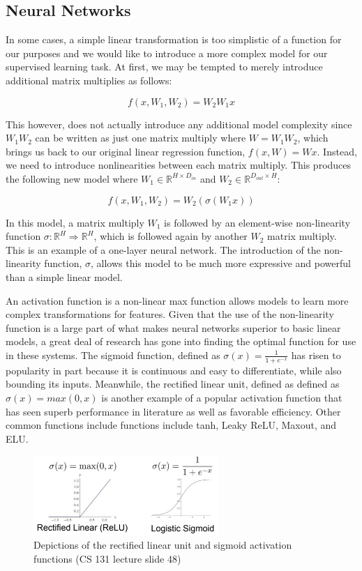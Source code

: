 ﻿\documentclass{article}
\begin{document}
\subsection{Neural Networks}
In some cases, a simple linear transformation is too simplistic of a function for our purposes and we would like to introduce a more complex model for our supervised learning task. At first, we may be tempted to merely introduce additional matrix multiplies as follows:

$$f(x, W_1, W_2) = W_2W_1x$$

This however, does not actually introduce any additional model complexity since $W_1W_2$ can be written as just one matrix multiply where $W = W_1W_2$, which brings us back to our original linear regression function, $f(x, W) = Wx$. Instead, we need to introduce nonlinearities between each matrix multiply. This produces the following new model where $W_1\in \mathbb{R}^{H \times D_{in}}$ and $W_2\in \mathbb{R}^{D_{out} \times H}$:

$$f(x,W_1,W_2) = W_2(\sigma(W_1x))$$ 

In this model, a matrix multiply $W_1$ is followed by an element-wise non-linearity function $\sigma : \mathbb{R}^H \Rightarrow \mathbb{R}^H$, which is followed again by another $W_2$ matrix multiply. This is an example of a one-layer neural network. The introduction of the non-linearity function, $\sigma$, allows this model to be much more expressive and powerful than a simple linear model.  

An activation function is a non-linear max function allows models to learn more complex transformations for features. Given that the use of the non-linearity function is a large part of what makes neural networks superior to basic linear models, a great deal of research has gone into finding the optimal function for use in these systems. The sigmoid function, defined as $\sigma(x) = \frac{1}{1+e^{-x}}$ has risen to popularity in part because it is continuous and easy to differentiate, while also bounding its inputs. Meanwhile, the rectified linear unit, defined as defined as $\sigma(x) = max(0,x)$ is another example of a popular activation function that has seen superb performance in literature as well as favorable efficiency. Other common functions include functions include tanh, Leaky ReLU, Maxout, and ELU.

\begin{figure}[h]
\includegraphics[width=7cm]{activation_functions.png}
\centering
\caption{Depictions of the rectified linear unit and sigmoid activation functions (CS 131 lecture slide 48)}
\end{figure}
\end{document}
